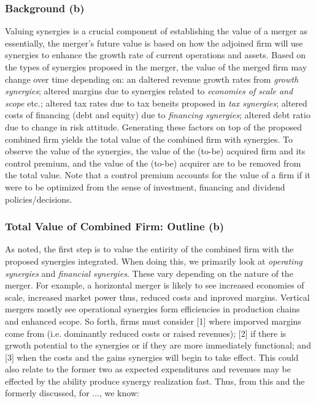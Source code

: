 \documentclass[11pt, english]{article}
\begin{document}
		\subsubsection*{Background (b)}

        Valuing synergies is a crucial component of establishing the value of a merger as essentially, the merger's future value is based on how the adjoined firm will use synergies to enhance the growth rate of current operations and assets. Based on the types of synergies proposed in the merger, the value of the merged firm may change over time depending on: an daltered revenue growth rates from \textit{growth synergies}; altered margins due to synergies related to \textit{economies of scale and scope} etc.; altered tax rates due to tax beneits proposed in \textit{tax synergies}; altered costs of financing (debt and equity) due to \textit{financing synergies}; altered debt ratio due to change in risk attitude. Generating these factors on top of the proposed combined firm yields the total value of the combined firm with synergies. To observe the value of the synergies, the value of the (to-be) acquired firm and its control premium, and the value of the (to-be) acquirer are to be removed from the total value. Note that a control premium accounts for the value of a firm if it were to be optimized from the sense of investment, financing and dividend policies/decisions.

                \subsubsection*{Total Value of Combined Firm: Outline (b)}

        As noted, the first step is to value the entirity of the combined firm with the proposed synergies integrated. When doing this, we primarily look at \textit{operating synergies} and \textit{financial synergies}. These vary depending on the nature of the merger. For example, a horizontal merger is likely to see increased economies of scale, increased market power thus, reduced costs and inproved margins. Vertical mergers mostly see operational synergies form efficiencies in production chains and enhanced scope. So forth, firms must consider [1] where imporved margins come from (i.e. dominantly reduced costs or raised revenues); [2] if there is grwoth potential to the synergies or if they are more immediately functional; and [3] when the costs and the gains synergies will begin to take effect. This could also relate to the former two as expected expenditures and revenues may be effected by the ability produce synergy realization fast. Thus, from this and the formerly discussed, for ..., we know:
\end{document}
